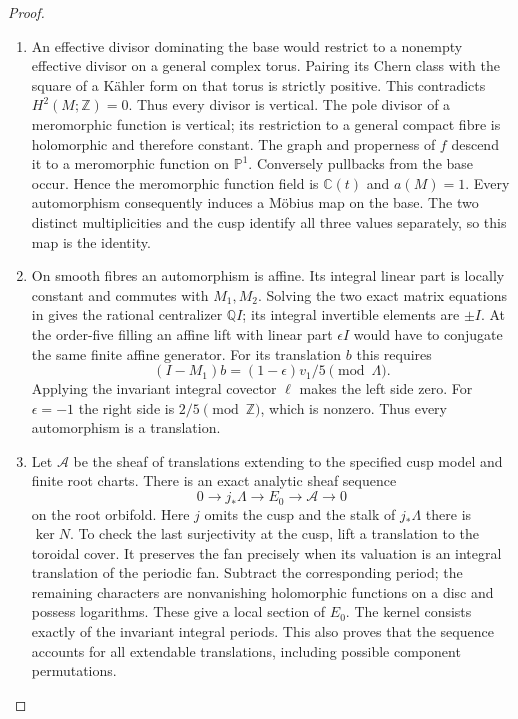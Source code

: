 \begin{proof}
\begin{enumerate}[label=\arabic*.]
\item An effective divisor dominating the base would restrict to
a nonempty effective divisor on a general complex torus.
Pairing its Chern class with the square of a Kähler form
on that torus is strictly positive. This contradicts
$H^2(M;\mathbb Z)=0$. Thus every divisor is vertical.
The pole divisor of a meromorphic function is vertical;
its restriction to a general compact fibre is holomorphic
and therefore constant. The graph and properness of $f$
descend it to a meromorphic function on $\mathbb P^1$.
Conversely pullbacks from the base occur. Hence the
meromorphic function field is $\mathbb C(t)$ and $a(M)=1$.
Every automorphism consequently induces a Möbius map on
the base. The two distinct multiplicities and the cusp
identify all three values separately, so this map is the
identity.

\item On smooth fibres an automorphism is affine. Its integral
linear part is locally constant and commutes with $M_1,M_2$.
Solving the two exact matrix equations in
 gives the rational
centralizer $\mathbb Q I$; its integral invertible elements
are $\pm I$. At the order-five filling an affine lift with
linear part $\epsilon I$ would have to conjugate the same
finite affine generator. For its translation $b$ this
requires
\[
(I-M_1)b=(1-\epsilon)v_1/5\pmod\Lambda.
\]
Applying the invariant integral covector $\ell$ makes the
left side zero. For $\epsilon=-1$ the right side is
$2/5\pmod\mathbb Z$, which is nonzero. Thus every
automorphism is a translation.

\item Let $\mathcal A$ be the sheaf of translations extending to
the specified cusp model and finite root charts. There is
an exact analytic sheaf sequence
\[
0\to j_*\Lambda\to E_0\to\mathcal A\to0
\]
on the root orbifold. Here $j$ omits the cusp and the stalk
of $j_*\Lambda$ there is $\ker N$.
To check the last surjectivity at the cusp, lift a translation
to the toroidal cover. It preserves the fan precisely when
its valuation is an integral translation of the periodic
fan. Subtract the corresponding period; the remaining
characters are nonvanishing holomorphic functions on a
disc and possess logarithms. These give a local section
of $E_0$. The kernel consists exactly of the invariant
integral periods. This also proves that the sequence
accounts for all extendable translations, including
possible component permutations.


\end{enumerate}
\end{proof}
